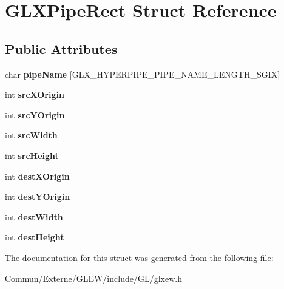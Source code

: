 \hypertarget{struct_g_l_x_pipe_rect}{}\section{G\+L\+X\+Pipe\+Rect Struct Reference}
\label{struct_g_l_x_pipe_rect}
\subsection*{Public Attributes}
\begin{DoxyCompactItemize}
\item 
char {\bfseries pipe\+Name} \mbox{[}G\+L\+X\+\_\+\+H\+Y\+P\+E\+R\+P\+I\+P\+E\+\_\+\+P\+I\+P\+E\+\_\+\+N\+A\+M\+E\+\_\+\+L\+E\+N\+G\+T\+H\+\_\+\+S\+G\+IX\mbox{]}\hypertarget{struct_g_l_x_pipe_rect_aa4c4f60e9647705ddefa10f95a37cb79}{}\label{struct_g_l_x_pipe_rect_aa4c4f60e9647705ddefa10f95a37cb79}

\item 
int {\bfseries src\+X\+Origin}\hypertarget{struct_g_l_x_pipe_rect_a9df2313c01f75d149e64f2ff467bc266}{}\label{struct_g_l_x_pipe_rect_a9df2313c01f75d149e64f2ff467bc266}

\item 
int {\bfseries src\+Y\+Origin}\hypertarget{struct_g_l_x_pipe_rect_a1f7316dff7050ab2ce9d3d37f8c5450e}{}\label{struct_g_l_x_pipe_rect_a1f7316dff7050ab2ce9d3d37f8c5450e}

\item 
int {\bfseries src\+Width}\hypertarget{struct_g_l_x_pipe_rect_a2c6c180a4dabb71076366e06a1c7d0ef}{}\label{struct_g_l_x_pipe_rect_a2c6c180a4dabb71076366e06a1c7d0ef}

\item 
int {\bfseries src\+Height}\hypertarget{struct_g_l_x_pipe_rect_a35632524bce6bffa05f284a9b1c1b8ff}{}\label{struct_g_l_x_pipe_rect_a35632524bce6bffa05f284a9b1c1b8ff}

\item 
int {\bfseries dest\+X\+Origin}\hypertarget{struct_g_l_x_pipe_rect_a8b7b941894ad3420326d7e9fa885bb71}{}\label{struct_g_l_x_pipe_rect_a8b7b941894ad3420326d7e9fa885bb71}

\item 
int {\bfseries dest\+Y\+Origin}\hypertarget{struct_g_l_x_pipe_rect_aef7766b02ef07c20a11e89da5878b469}{}\label{struct_g_l_x_pipe_rect_aef7766b02ef07c20a11e89da5878b469}

\item 
int {\bfseries dest\+Width}\hypertarget{struct_g_l_x_pipe_rect_a3c07991d2a8fb6e973eae834650b3dad}{}\label{struct_g_l_x_pipe_rect_a3c07991d2a8fb6e973eae834650b3dad}

\item 
int {\bfseries dest\+Height}\hypertarget{struct_g_l_x_pipe_rect_a858b0ea6642e451495aff35cfefbd083}{}\label{struct_g_l_x_pipe_rect_a858b0ea6642e451495aff35cfefbd083}

\end{DoxyCompactItemize}


The documentation for this struct was generated from the following file\+:\begin{DoxyCompactItemize}
\item 
Commun/\+Externe/\+G\+L\+E\+W/include/\+G\+L/glxew.\+h\end{DoxyCompactItemize}

